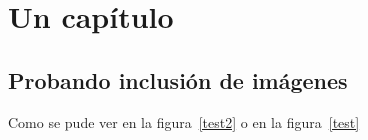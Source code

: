 \chapter{Un capítulo}

\section{Probando inclusión de imágenes}


Como se pude ver en la figura~\ref{test2} o en la figura~\ref{test}

